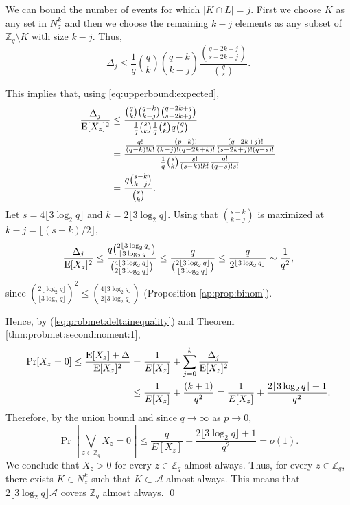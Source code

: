 We can bound the number of events for which $|K \cap L| = j$. First we choose $K$ as any set in $N_z^k$ and then we choose the remaining $k- j$ elements as any subset of $\mathbb{Z}_q \setminus K$ with size $k - j$. Thus, 
\[\Delta_j \leq \frac{1}{q}\binom{q}{k}\binom{q - k}{k - j} \frac{\binom{q - 2k + j}{s - 2k + j}}{\binom{q}{s}}.\]
\par This implies that, using \ref{eq:upperbound:expected},
\begin{align*}
    \frac{\Delta_j}{\mathrm{E}[X_z]^2} &\leq \frac{\binom{q}{k} \binom{q - k}{k - j}\binom{q - 2k + j}{s - 2k + j}}{\frac{1}{q} \binom{s}{k}\frac{1}{q} \binom{s}{k}q\binom{q}{s}} \\
    &= \frac{\frac{q!}{(q - k)!k!}\frac{(p - k)!}{(k - j)!(q - 2k + k)!}\frac{(q - 2k + j)!}{(s - 2k + j)!(q - s)!}}{\frac{1}{q}\binom{s}{k}\frac{s!}{(s - k)!k!}\frac{q!}{(q - s)!s!}} \\
    &= \frac{q\binom{s - k}{k - j}}{\binom{s}{k}}.
\end{align*}
Let $s = 4\lfloor 3 \log_2 q \rfloor$ and $k = 2\lfloor 3 \log_2 q \rfloor$. Using that $\binom{s - k}{k - j}$ is maximized at $k - j = \lfloor (s - k) / 2\rfloor$,
\begin{align*}
\frac{\Delta_j}{\mathrm{E}[X_z]^2} \leq \frac{q \binom{2\lfloor 3 \log_2 q\rfloor}{\lfloor 3 \log_2 q \rfloor}}{\binom{4\lfloor 3\log_2 q \rfloor}{2\lfloor 3\log_2 q \rfloor}} \leq \frac{q}{\binom{2\lfloor 3 \log_2 q \rfloor }{ \lfloor 3 \log_2 q \rfloor}} \leq \frac{q}{2^{\lfloor 3 \log_2 q \rfloor}} \sim \frac{1}{q^2},
\end{align*}
since \(\binom{2\lfloor \log_2 q \rfloor}{\lfloor 3 \log_2 q \rfloor}^2 \leq \binom{4\lfloor 3 \log_2 q \rfloor }{2\lfloor 3 \log_2 q \rfloor}\) (Proposition \ref{ap:prop:binom}).   \par
Hence, by (\ref{eq:probmet:deltainequality}) and Theorem \ref{thm:probmet:secondmoment:1},
\begin{align*}
\mathrm{Pr}[X_z = 0] \leq \frac{\mathrm{E}[X_z] + \Delta}{\mathrm{E}[X_z]^2} &= \frac{1}{E[X_z]} + \sum_{j = 0}^k \frac{\Delta_j}{\mathrm{E}[X_z]^2} \\
&\leq \frac{1}{E[X_z]} + \frac{(k + 1)}{q^2} = \frac{1}{E[X_z]} + \frac{2\lfloor 3 \log_2 q\rfloor + 1}{q^2}.
\end{align*}
Therefore, by the union bound and since $q \to \infty$ as $p \to 0$,
\[\Pr\left[\bigvee_{z \in \mathbb{Z}_q} X_z = 0\right] \leq \frac{q}{E[X_z]} + \frac{2\lfloor 3 \log_2 q\rfloor + 1}{q^2} = o(1).\]
We conclude that $X_z > 0$ for every $z \in \mathbb{Z}_q$ almost always. Thus, for every $z \in \mathbb{Z}_q$, there exists $K \in N_z^k$ such that $K \subset \mathcal{A}$ almost always. This means that $2\lfloor 3 \log_2 q\rfloor \mathcal{A}$ covers $\mathbb{Z}_q$ almost always. \qed

